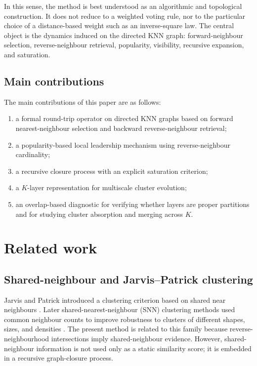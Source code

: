 \documentclass[pdflatex,sn-mathphys-num]{sn-jnl}
\begin{document}
In this sense, the method is best understood as an algorithmic and topological construction. It does not reduce to a weighted voting rule, nor to the particular choice of a distance-based weight such as an inverse-square law. The central object is the dynamics induced on the directed KNN graph: forward-neighbour selection, reverse-neighbour retrieval, popularity, visibility, recursive expansion, and saturation.

\subsection{Main contributions}

The main contributions of this paper are as follows:
\begin{enumerate}
\item a formal round-trip operator on directed KNN graphs based on forward nearest-neighbour selection and backward reverse-neighbour retrieval;
\item a popularity-based local leadership mechanism using reverse-neighbour cardinality;
\item a recursive closure process with an explicit saturation criterion;
\item a $K$-layer representation for multiscale cluster evolution;
\item an overlap-based diagnostic for verifying whether layers are proper partitions and for studying cluster absorption and merging across $K$.
\end{enumerate}



\section{Related work}\label{sec:related}

\subsection{Shared-neighbour and Jarvis--Patrick clustering}

Jarvis and Patrick introduced a clustering criterion based on shared near neighbours \citep{JarvisPatrick1973}. Later shared-nearest-neighbour (SNN) clustering methods used common neighbour counts to improve robustness to clusters of different shapes, sizes, and densities \citep{ErtozSteinbachKumar2003}. The present method is related to this family because reverse-neighbourhood intersections imply shared-neighbour evidence. However, shared-neighbour information is not used only as a static similarity score; it is embedded in a recursive graph-closure process.
\end{document}
